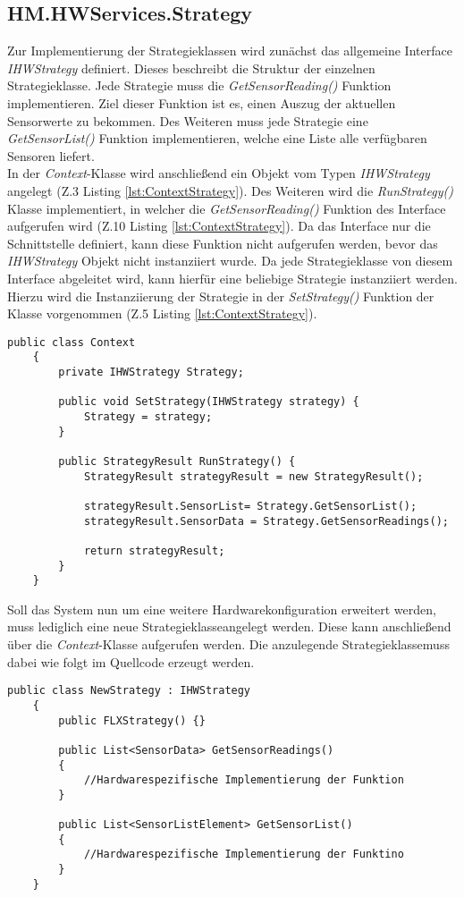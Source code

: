 \subsection{HM.HWServices.Strategy}
Zur Implementierung der Strategieklassen wird zunächst das allgemeine Interface \textit{IHWStrategy} definiert. Dieses beschreibt die Struktur der einzelnen Strategieklasse. Jede Strategie muss die \textit{GetSensorReading()} Funktion implementieren. Ziel dieser Funktion ist es, einen Auszug der aktuellen Sensorwerte zu bekommen. Des Weiteren muss jede Strategie eine \textit{GetSensorList()} Funktion implementieren, welche eine Liste alle verfügbaren Sensoren liefert.\\
In der \textit{Context}-Klasse wird anschließend ein Objekt vom Typen \textit{IHWStrategy} angelegt (Z.3 Listing \ref{lst:ContextStrategy}). Des Weiteren wird die \textit{RunStrategy()} Klasse implementiert, in welcher die \textit{GetSensorReading()} Funktion des Interface aufgerufen wird (Z.10 Listing \ref{lst:ContextStrategy}). Da das Interface nur die Schnittstelle definiert, kann diese Funktion nicht aufgerufen werden, bevor das \textit{IHWStrategy} Objekt nicht instanziiert wurde. Da jede Strategieklasse von diesem Interface abgeleitet wird, kann hierfür eine beliebige Strategie instanziiert werden. Hierzu wird die Instanziierung der Strategie in der \textit{SetStrategy()} Funktion der Klasse vorgenommen (Z.5 Listing \ref{lst:ContextStrategy}).
\begin{lstlisting}[caption={Context des Strategiepatterns}, label={lst:ContextStrategy}]
    public class Context
    {
        private IHWStrategy Strategy;
   
        public void SetStrategy(IHWStrategy strategy) { 
            Strategy = strategy; 
        }

        public StrategyResult RunStrategy() {
            StrategyResult strategyResult = new StrategyResult();

            strategyResult.SensorList= Strategy.GetSensorList();
            strategyResult.SensorData = Strategy.GetSensorReadings();

            return strategyResult;
        }
    }\end{lstlisting}  
Soll das System nun um eine weitere Hardwarekonfiguration erweitert werden, muss lediglich eine neue Strategieklasseangelegt werden. Diese kann anschließend über die \textit{Context}-Klasse aufgerufen werden. Die anzulegende Strategieklassemuss dabei wie folgt im Quellcode erzeugt werden. 
\begin{lstlisting}[caption={Implementierung einer weiteren Strategieklasse}, label={lst:NewStrategy}]
    public class NewStrategy : IHWStrategy
    {
        public FLXStrategy() {}

        public List<SensorData> GetSensorReadings() 
        {
            //Hardwarespezifische Implementierung der Funktion
        }
        
        public List<SensorListElement> GetSensorList() 
        { 
            //Hardwarespezifische Implementierung der Funktino  
        }
    }\end{lstlisting}  